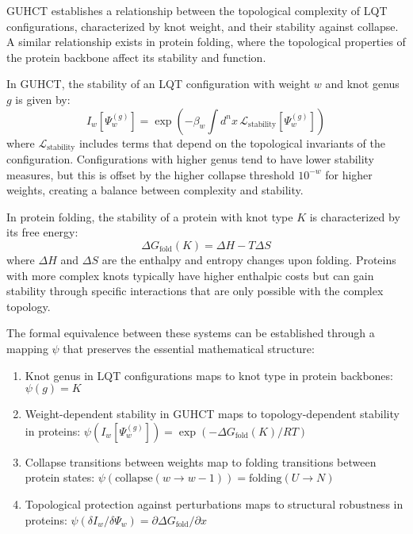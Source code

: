 \documentclass[11pt,a4paper]{article}
\makeatletter
\renewenvironment{proof}[1][\proofname]{\par
  \pushQED{\qed}%
  \normalfont \topsep6\p@\@plus6\p@\relax
  \trivlist
  \item[\hskip\labelsep
        \itshape
    #1\@addpunct{.}]\ignorespaces
}{%
  \popQED\endtrivlist\@endpefalse
}
\makeatother
\begin{document}
\begin{proof}
GUHCT establishes a relationship between the topological complexity of LQT configurations, characterized by knot weight, and their stability against collapse. A similar relationship exists in protein folding, where the topological properties of the protein backbone affect its stability and function.

In GUHCT, the stability of an LQT configuration with weight $w$ and knot genus $g$ is given by:
\begin{equation}
I_w[\Psi_w^{(g)}] = \exp\left(-\beta_w \int d^nx \, \mathcal{L}_{\text{stability}}[\Psi_w^{(g)}]\right)
\end{equation}
where $\mathcal{L}_{\text{stability}}$ includes terms that depend on the topological invariants of the configuration. Configurations with higher genus tend to have lower stability measures, but this is offset by the higher collapse threshold $10^{-w}$ for higher weights, creating a balance between complexity and stability.

In protein folding, the stability of a protein with knot type $K$ is characterized by its free energy:
\begin{equation}
\Delta G_{\text{fold}}(K) = \Delta H - T \Delta S
\end{equation}
where $\Delta H$ and $\Delta S$ are the enthalpy and entropy changes upon folding. Proteins with more complex knots typically have higher enthalpic costs but can gain stability through specific interactions that are only possible with the complex topology.

The formal equivalence between these systems can be established through a mapping $\psi$ that preserves the essential mathematical structure:
\begin{enumerate}
    \item Knot genus in LQT configurations maps to knot type in protein backbones: $\psi(g) = K$
    \item Weight-dependent stability in GUHCT maps to topology-dependent stability in proteins: $\psi(I_w[\Psi_w^{(g)}]) = \exp(-\Delta G_{\text{fold}}(K)/RT)$
    \item Collapse transitions between weights map to folding transitions between protein states: $\psi(\text{collapse}(w \to w-1)) = \text{folding}(U \to N)$
    \item Topological protection against perturbations maps to structural robustness in proteins: $\psi(\delta I_w / \delta \Psi_w) = \partial \Delta G_{\text{fold}} / \partial x$
\end{enumerate}


\end{proof}
\end{document}
